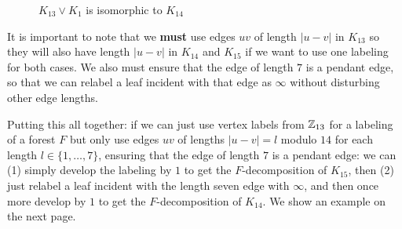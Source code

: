 \begin{figure}[H]
\begin{center}
  \end{center}
  \caption{$K_{13}\vee K_{1}$ is isomorphic to $K_{14}$}
  \label{fig:K13infty}
\end{figure}

\noindent It is important to note that we \textbf{must} use edges $uv$ of length $|u-v|$ in $K_{13}$ so they will also have length $|u-v|$ in $K_{14}$ and $K_{15}$ if we want to use one labeling for both cases. We also must ensure that the edge of length $7$ is a pendant edge, so that we can relabel a leaf incident with that edge as $\infty$ without disturbing other edge lengths.

Putting this all together: if we can just use vertex labels from $\mathbb{Z}_{13}$ for a labeling of a forest $F$ but only use edges $uv$ of lengths $|u-v|=l$ modulo $14$ for each length $l\in \{1,\hdots,7\}$, ensuring that the edge of length $7$ is a pendant edge: we can (1) simply develop the labeling by $1$ to get the $F$-decomposition of $K_{15}$, then (2) just relabel a leaf incident with the length seven edge with $\infty$, and then once more develop by $1$ to get the $F$-decomposition of $K_{14}$. We show an example on the next page.

